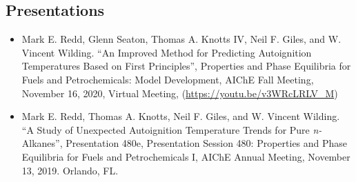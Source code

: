 \subsection{Presentations}\label{presentations}

\begin{itemize}
\tightlist
\item
  Mark E. Redd, Glenn Seaton, Thomas A. Knotts IV, Neil F. Giles, and W.
  Vincent Wilding. ``An Improved Method for Predicting Autoignition
  Temperatures Based on First Principles'', Properties and Phase
  Equilibria for Fuels and Petrochemicals: Model Development, AIChE Fall
  Meeting, November 16, 2020, Virtual Meeting,
  (\url{https://youtu.be/v3WRcLRLV_M})
\item
  Mark E. Redd, Thomas A. Knotts, Neil F. Giles, and W. Vincent Wilding.
  ``A Study of Unexpected Autoignition Temperature Trends for Pure
  \emph{n-}Alkanes'', Presentation 480e, Presentation Session 480:
  Properties and Phase Equilibria for Fuels and Petrochemicals I, AIChE
  Annual Meeting, November 13, 2019. Orlando, FL.
\end{itemize}
